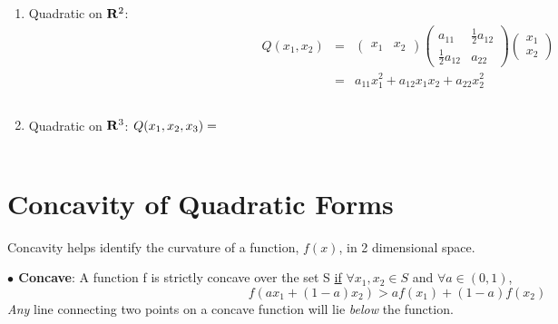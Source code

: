 \documentclass[]{book}
\theoremstyle{definition}
\theoremstyle{definition}
\theoremstyle{definition}
\theoremstyle{remark}
\begin{document}
\begin{enumerate}
  \item Quadratic on ${\bf R}^2$:
  \begin{eqnarray*}
  Q(x_1,x_2)&=&\begin{pmatrix} x_1& x_2 \end{pmatrix} \begin{pmatrix} a_{11}&\frac{1}{2} a_{12}\\
  \frac{1}{2}a_{12}&a_{22}\end{pmatrix} \begin{pmatrix} x_1\\x_2 \end{pmatrix} \\
  &=& a_{11}x_1^2 + a_{12}x_1x_2 + a_{22}x_2^2
  \end{eqnarray*}
  
  \item Quadratic on ${\bf R}^3$:
  $Q(x_1,x_2,x_3)= 
  \phantom{
  \begin{pmatrix} x_1& x_2&x_3 \end{pmatrix}
  \begin{pmatrix} a_{11}&\frac{1}{2} a_{12}&\frac{1}{2} a_{13}\\
  \frac{1}{2}a_{12}&a_{22}&\frac{1}{2} a_{23}\\
  \frac{1}{2}a_{13}&\frac{1}{2}a_{23}& a_{33}\end{pmatrix}
  \begin{pmatrix} x_1\\x_2\\x_3 \end{pmatrix} \\
  = a_{11}x_1^2 + a_{22}x_2^2 + a_{33}x_3^2 + a_{12}x_1x_2 +
      a_{13}x_1x_3 + a_{23}x_2x_3}$
  \vspace{2cm}
\end{enumerate}

\section{Concavity of Quadratic
Forms}\label{concavity-of-quadratic-forms}

Concavity helps identify the curvature of a function, \(f( x)\), in 2
dimensional space.

\parbox[c]{5in}{{\bf $\bullet$ Concave}: A function f is strictly concave over the set S \underline{if} $\forall x_1,x_2 \in S$ and $\forall a \in (0,1)$, $$f(ax_1 + (1-a)x_2) > af(x_1) + (1-a)f(x_2)$$
\textit{Any} line connecting two points on a concave function will lie \textit{below} the function.}
\end{document}
